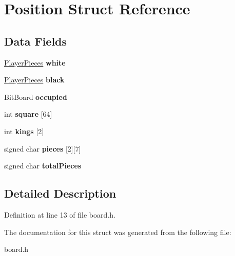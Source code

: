 \hypertarget{struct_position}{\section{Position Struct Reference}
\label{struct_position}
}
\subsection*{Data Fields}
\begin{DoxyCompactItemize}
\item 
\hypertarget{struct_position_ab768df3c3e52c8d55f0ab17fb8a768e8}{\hyperlink{struct_player_pieces}{Player\-Pieces} {\bfseries white}}\label{struct_position_ab768df3c3e52c8d55f0ab17fb8a768e8}

\item 
\hypertarget{struct_position_ac748516245097c77fc213654d7a7b410}{\hyperlink{struct_player_pieces}{Player\-Pieces} {\bfseries black}}\label{struct_position_ac748516245097c77fc213654d7a7b410}

\item 
\hypertarget{struct_position_af626d95e9920d8ce4130305130bcf327}{Bit\-Board {\bfseries occupied}}\label{struct_position_af626d95e9920d8ce4130305130bcf327}

\item 
\hypertarget{struct_position_a3714c25746f516f66b317749d9452971}{int {\bfseries square} \mbox{[}64\mbox{]}}\label{struct_position_a3714c25746f516f66b317749d9452971}

\item 
\hypertarget{struct_position_abc8ee4e35db9010237cd96c9192ba836}{int {\bfseries kings} \mbox{[}2\mbox{]}}\label{struct_position_abc8ee4e35db9010237cd96c9192ba836}

\item 
\hypertarget{struct_position_a5571fe1d6f318079b117ff250599cda2}{signed char {\bfseries pieces} \mbox{[}2\mbox{]}\mbox{[}7\mbox{]}}\label{struct_position_a5571fe1d6f318079b117ff250599cda2}

\item 
\hypertarget{struct_position_ae83867200dcbd6954669abf0f5846524}{signed char {\bfseries total\-Pieces}}\label{struct_position_ae83867200dcbd6954669abf0f5846524}

\end{DoxyCompactItemize}


\subsection{Detailed Description}


Definition at line 13 of file board.\-h.



The documentation for this struct was generated from the following file\-:\begin{DoxyCompactItemize}
\item 
board.\-h\end{DoxyCompactItemize}
